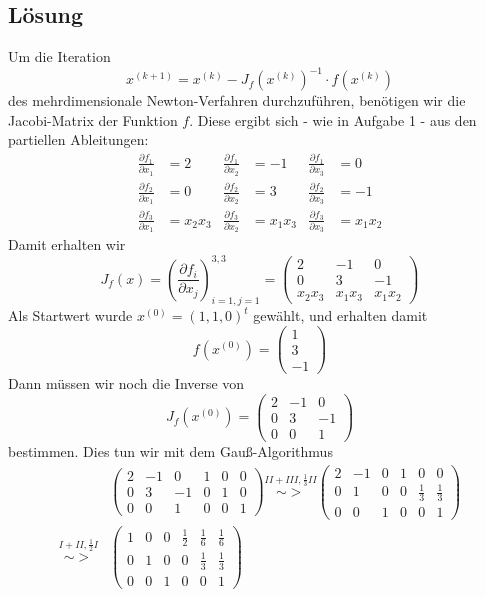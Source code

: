 \subsection*{Lösung}
Um die Iteration 
$$
x^{(k+1)}=x^{(k)} - J_f(x^{(k)})^{-1}\cdot f(x^{(k)})
$$
des mehrdimensionale Newton-Verfahren durchzuführen, benötigen wir die Jacobi-Matrix der Funktion $f$. Diese ergibt sich - wie in Aufgabe 1 - aus den partiellen Ableitungen:
\begin{align*}
\frac{\partial f_1}{\partial x_1} &=2  &\frac{\partial f_1}{\partial x_2}&=-1 &\frac{\partial f_1}{\partial x_3}&=0    \\
\frac{\partial f_2}{\partial x_1} &=0  &\frac{\partial f_2}{\partial x_2}&=3 &\frac{\partial f_2}{\partial x_3}&=-1  \\
\frac{\partial f_3}{\partial x_1} &=x_2x_3 &\frac{\partial f_3}{\partial x_2}&=x_1x_3 &\frac{\partial f_3}{\partial x_3}&=x_1x_2
\end{align*}
Damit erhalten wir
$$
J_f(x)=\left( \frac{\partial f_i}{\partial x_j}\right)_{i=1,j=1}^{3,3} =\begin{pmatrix} 2 & -1 & 0 \\ 0 & 3& -1 \\ x_2x_3&x_1x_3&x_1x_2   \end{pmatrix}
$$
Als Startwert wurde $x^{(0)}=(1,1,0)^t$ gewählt, und erhalten damit
$$
f(x^{(0)})=\begin{pmatrix} 1\\3\\-1 \end{pmatrix}
$$
Dann müssen wir noch die Inverse von 
$$
J_f(x^{(0)})=\begin{pmatrix} 2 & -1 & 0 \\ 0 & 3& -1 \\ 0&0&1   \end{pmatrix}
$$
bestimmen. Dies tun wir mit dem Gauß-Algorithmus
\begin{align*}
&\left(
		\begin{array}{ccc|ccc}
			2&-1&0 	&1&0&0\\
			0&3&-1	&0&1&0\\
			0&0&1	&0&0&1
		\end{array}
		\right) \stackrel{II+III, \frac{1}{3}II}{\sim>} 
				\left(
		\begin{array}{ccc|ccc}
			2&-1&0 	&1&0&0\\
			0&1&0	&0&\frac{1}{3}&\frac{1}{3}\\
			0&0&1	&0&0&1
		\end{array}
		\right)\\
		\stackrel{I+II, \frac{1}{2}I}{\sim>} 
				&\left(
		\begin{array}{ccc|ccc}
			1&0&0 	&\frac{1}{2}&\frac{1}{6}&\frac{1}{6}\\
			0&1&0	&0&\frac{1}{3}&\frac{1}{3}\\
			0&0&1	&0&0&1
		\end{array}
		\right)
\end{align*}
